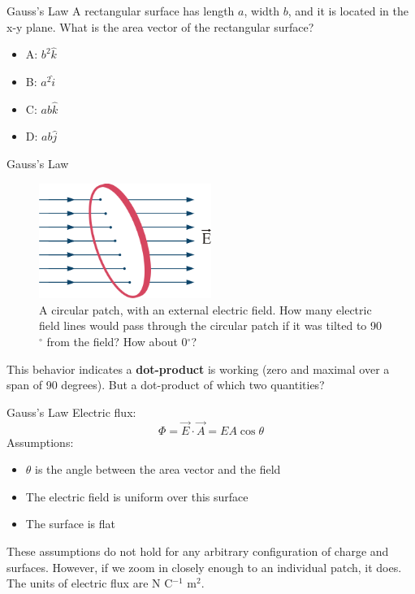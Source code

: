 \documentclass{beamer}
\begin{document}
\begin{frame}{Gauss's Law}
A rectangular surface has length $a$, width $b$, and it is located in the x-y plane.  What is the area vector of the rectangular surface?
\begin{itemize}
\item A: $b^2 \hat{k}$
\item B: $a^2 \hat{i}$
\item C: $ab \hat{k}$
\item D: $ab \hat{j}$
\end{itemize}
\end{frame}

\begin{frame}{Gauss's Law}
\small
\begin{figure}
\centering
\includegraphics[width=0.5\textwidth]{figures/coin.png}
\caption{\label{fig:coin} A circular patch, with an external electric field.  How many electric field lines would pass through the circular patch if it was tilted to 90$^{\circ}$ from the field?  How about 0$^{\circ}$?}
\end{figure}
This behavior indicates a \textbf{dot-product} is working (zero and maximal over a span of 90 degrees).  But a dot-product of which two quantities?
\end{frame}

\begin{frame}{Gauss's Law}
Electric flux:
\begin{equation}
\boxed{
\Phi = \vec{E} \cdot \vec{A}} = E A \cos\theta
\end{equation}
Assumptions:
\begin{itemize}
\item $\theta$ is the angle between the area vector and the field
\item The electric field is uniform over this surface
\item The surface is flat
\end{itemize}
These assumptions do not hold for any arbitrary configuration of charge and surfaces.  However, if we zoom in closely enough to an individual patch, it does. \\ \vspace{0.5cm}
The units of electric flux are N C$^{-1}$ m$^2$.
\end{frame}
\end{document}
